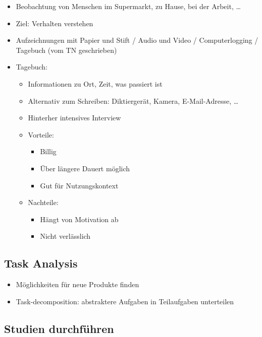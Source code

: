 \begin{itemize}
\item
  Beobachtung von Menschen im Supermarkt, zu Hause, bei der Arbeit,
  \ldots{}
\item
  Ziel: Verhalten verstehen
\item
  Aufzeichnungen mit Papier und Stift / Audio und Video /
  Computerlogging / Tagebuch (vom TN geschrieben)
\item
  Tagebuch:

  \begin{itemize}
  \item
    Informationen zu Ort, Zeit, was passiert ist
  \item
    Alternativ zum Schreiben: Diktiergerät, Kamera, E-Mail-Adresse,
    \ldots{}
  \item
    Hinterher intensives Interview
  \item
    Vorteile:

    \begin{itemize}
    \item
      Billig
    \item
      Über längere Dauert möglich
    \item
      Gut für Nutzungskontext
    \end{itemize}
  \item
    Nachteile:

    \begin{itemize}
    \item
      Hängt von Motivation ab
    \item
      Nicht verlässlich
    \end{itemize}
  \end{itemize}
\end{itemize}

\subsection{Task Analysis}

\begin{itemize}
\item
  Möglichkeiten für neue Produkte finden
\item
  Task-decomposition: abstraktere Aufgaben in Teilaufgaben unterteilen
\end{itemize}

\subsection{Studien durchführen}

